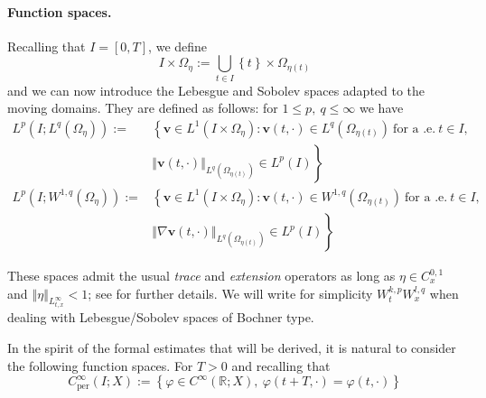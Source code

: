 \documentclass[10pt,a4paper]{article}
\numberwithin{equation}{section}
\begin{document}
\paragraph{Function spaces.}

Recalling that $I = [0,T]$, we define
\begin{equation}
I \times \Omega_{\eta} := \bigcup_{t\in I} \left\{ t\right\} \times\Omega_{\eta\left(t\right)}
\end{equation} and we can now introduce the Lebesgue and Sobolev spaces adapted to the moving domains. They are defined as follows: for $1 \le p, \ q \le \infty$ we have
\begin{equation}
\begin{aligned}L^{p}\left(I;L^{q}\left(\Omega_{\eta}\right)\right):= & \left\{ \mathbf{v}\in L^{1}\left(I\times\Omega_{\eta}\right):\mathbf{v}\left(t,\cdot\right)\in L^{q}\left(\Omega_{\eta\left(t\right)}\right)\ \text{for a .e.}\ t\in I,\right.\\
 & \left\Vert \mathbf{v}\left(t,\cdot\right)\right\Vert _{L^{q}\left(\Omega_{\eta\left(t\right)}\right)}\in L^{p}\left(I\right)\left.\right\} \\
L^{p}\left(I;W^{1,q}\left(\Omega_{\eta}\right)\right):= & \left\{ \mathbf{v}\in L^{1}\left(I\times\Omega_{\eta}\right):\mathbf{v}\left(t,\cdot\right)\in W^{1,q}\left(\Omega_{\eta\left(t\right)}\right)\ \text{for a .e.}\ t\in I,\right.\\
 & \left\Vert \nabla\mathbf{v}\left(t,\cdot\right)\right\Vert _{L^{q}\left(\Omega_{\eta\left(t\right)}\right)}\in L^{p}\left(I\right)\left.\right\} 
\end{aligned}
\end{equation}

These spaces admit  the  usual \emph{trace} and \emph{extension} operators as long as  $\eta\in C_{x}^{0,1}$ and $\left\Vert \eta\right\Vert _{L_{t,x}^{\infty}}<1$; see  \cite[Lemma 1]{Gr05} for further details.
We will write for simplicity $W_{t}^{k,p}W_{x}^{l,q}$ when dealing with Lebesgue/Sobolev spaces of Bochner type.

In the spirit of the  formal estimates that will be derived, it  is natural to consider the following function spaces. 
 For  $T>0$ and recalling that
 \[
C_{\text{per}}^{\infty}\left(I;X\right):=\left\{ \varphi\in C^{\infty}\left(\mathbb{R};X\right),\ \varphi\left(t+T,\cdot\right)=\varphi\left(t,\cdot\right)\right\} 
 \] 
 
\end{document}
